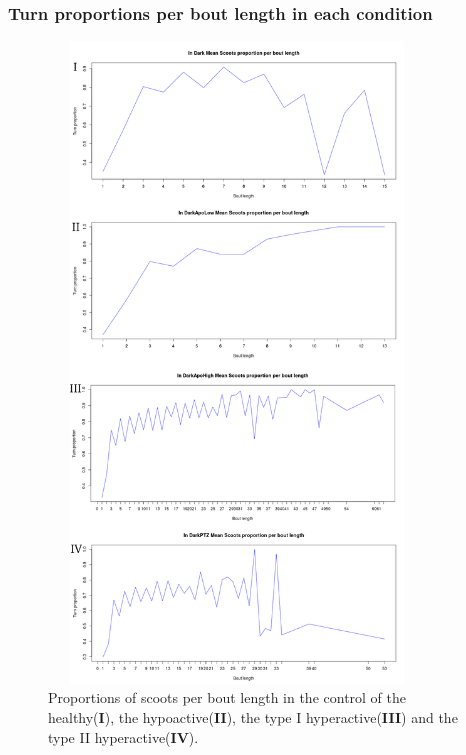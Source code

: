 \documentclass[a4paper,12pt]{article}
\begin{document}
\subsubsection{Turn proportions per bout length in each condition}

\begin{figure}[h!]
\begin{center}
\includegraphics[width=10cm,height=17cm]{boutlengthturnproportion.png}
\caption{Proportions of scoots per bout length in the control of the healthy(\textbf{I}), the hypoactive(\textbf{II}), the type I hyperactive(\textbf{III}) and the type II hyperactive(\textbf{IV}).}
\end{center}
\end{figure}
\newpage
\end{document}
